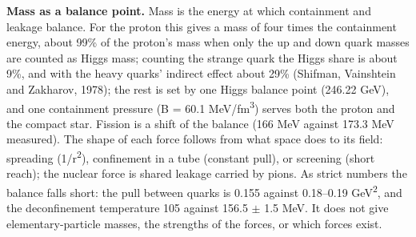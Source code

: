\documentclass[
  11pt,
]{article}
\begin{document}
\textbf{Mass as a balance point.} Mass is the energy at which containment and leakage balance. For the proton this gives a mass of four times the containment energy, about 99\% of the proton's mass when only the up and down quark masses are counted as Higgs mass; counting the strange quark the Higgs share is about 9\%, and with the heavy quarks' indirect effect about 29\% (Shifman, Vainshtein and Zakharov, 1978); the rest is set by one Higgs balance point (246.22 GeV), and one containment pressure (B = 60.1 MeV/fm\textsuperscript{3}) serves both the proton and the compact star. Fission is a shift of the balance (166 MeV against 173.3 MeV measured). The shape of each force follows from what space does to its field: spreading (1/r\textsuperscript{2}), confinement in a tube (constant pull), or screening (short reach); the nuclear force is shared leakage carried by pions. As strict numbers the balance falls short: the pull between quarks is 0.155 against 0.18--0.19 GeV\textsuperscript{2}, and the deconfinement temperature 105 against 156.5 \ensuremath{\pm} 1.5 MeV. It does not give elementary-particle masses, the strengths of the forces, or which forces exist.
\end{document}
